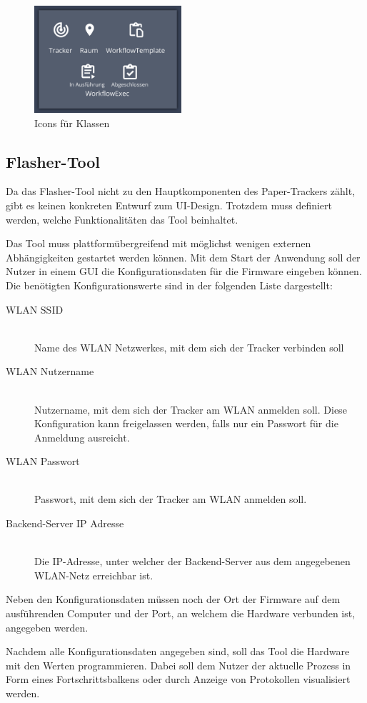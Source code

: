 \begin{figure}[h!tbp]
	\includegraphics[height=150px]{images/ui-prototype/class-icons.png}
	\centering
	\caption{Icons für Klassen}
	\label{fig:ui-icons}
\end{figure}

\subsection{Flasher-Tool}
Da das Flasher-Tool nicht zu den Hauptkomponenten des Paper-Trackers zählt, gibt es keinen konkreten Entwurf zum \gls{UI}-Design.
Trotzdem muss definiert werden, welche Funktionalitäten das Tool beinhaltet.

Das Tool muss plattformübergreifend mit möglichst wenigen externen Abhängigkeiten gestartet werden können.
Mit dem Start der Anwendung soll der Nutzer in einem \gls{GUI} die Konfigurationsdaten für die Firmware eingeben können.
Die benötigten Konfigurationswerte sind in der folgenden Liste dargestellt:

\begin{description}
	\item[\gls{WLAN} \gls{SSID}] \hfill \\
		Name des \gls{WLAN} Netzwerkes, mit dem sich der Tracker verbinden soll
	\item[\gls{WLAN} Nutzername] \hfill \\
		Nutzername, mit dem sich der Tracker am \gls{WLAN} anmelden soll. Diese Konfiguration kann freigelassen werden, falls nur ein Passwort für die Anmeldung ausreicht.
	\item[\gls{WLAN} Passwort] \hfill \\
		Passwort, mit dem sich der Tracker am \gls{WLAN} anmelden soll.
	\item[Backend-Server \gls{IP} Adresse] \hfill \\
		Die \gls{IP}-Adresse, unter welcher der Backend-Server aus dem angegebenen \gls{WLAN}-Netz erreichbar ist.
\end{description}

Neben den Konfigurationsdaten müssen noch der Ort der Firmware auf dem ausführenden Computer und der Port, an welchem die Hardware verbunden ist, angegeben werden.

Nachdem alle Konfigurationsdaten angegeben sind, soll das Tool die Hardware mit den Werten programmieren.
Dabei soll dem Nutzer der aktuelle Prozess in Form eines Fortschrittsbalkens oder durch Anzeige von Protokollen visualisiert werden.
